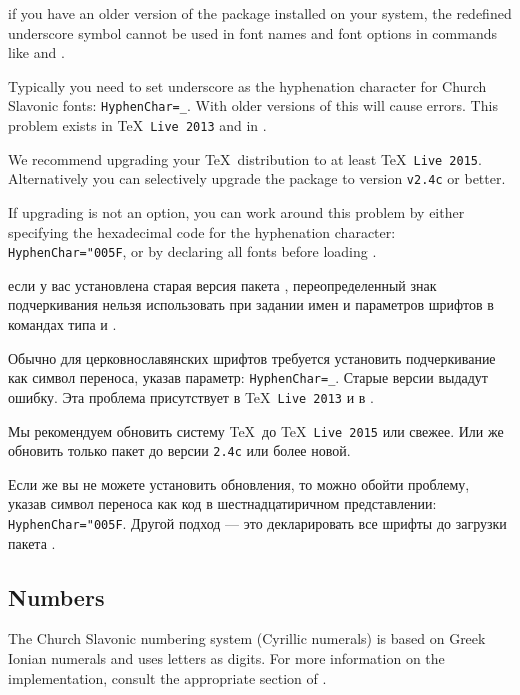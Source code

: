 \begin{EN}
 if you have an older version of the  package installed on your system,
the redefined underscore symbol cannot be used in font names and font options in  commands like
 and .

Typically you need to set underscore as the hyphenation character for Church Slavonic fonts: \texttt{HyphenChar=_}.
With older versions of  this will cause errors. This problem exists in \TeX\ \texttt{Live 2013} and in .

We recommend upgrading your \TeX\ distribution to at least \TeX\ \texttt{Live 2015}. Alternatively you can selectively
upgrade the  package to version \texttt{v2.4c} or better.

If upgrading is not an option, you can work around this problem by either specifying the hexadecimal code for the hyphenation
character: \texttt{HyphenChar="005F}, or by declaring all fonts before loading .
\end{EN}

\begin{RU}
 если у вас установлена старая версия пакета , 
переопределенный знак подчеркивания нельзя использовать при задании имен и параметров шрифтов в командах  типа
 и .

Обычно для церковнославянских шрифтов требуется установить подчеркивание как символ переноса, указав параметр:
\texttt{HyphenChar=_}. Старые версии  выдадут ошибку. 
Эта проблема присутствует в \TeX\ \texttt{Live 2013} и в .

Мы рекомендуем обновить систему \TeX\ до \TeX\ \texttt{Live 2015} или свежее.
Или же обновить только пакет  до
версии \texttt{2.4c} или более новой.

Если же вы не можете установить обновления, то можно
обойти проблему, указав символ переноса как код в шестнадцатиричном представлении:
\texttt{HyphenChar="005F}. Другой подход --- это декларировать все шрифты до загрузки пакета .
\end{RU}

\begin{EN}
\section{Numbers}

The Church Slavonic numbering system (Cyrillic numerals)
is based on Greek Ionian numerals and uses letters as digits.
For more information on the implementation, consult the appropriate section of \cite{UN41}.
\end{EN}

